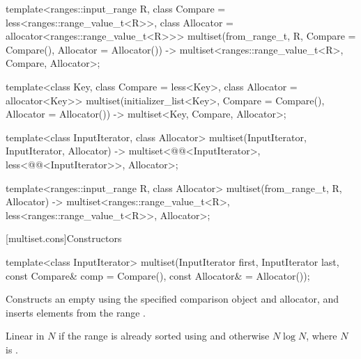 \documentclass{wg21}
\begin{document}
\begin{addedblock}
\begin{codeblock}
template<ranges::input_range R, class Compare = less<ranges::range_value_t<R>>, 
    class Allocator = allocator<ranges::range_value_t<R>>>
multiset(from_range_t, R, Compare = Compare(), Allocator = Allocator())
-> multiset<ranges::range_value_t<R>,  Compare, Allocator>;
\end{codeblock}
\end{addedblock}
\begin{codeblock}

template<class Key, class Compare = less<Key>, class Allocator = allocator<Key>>
multiset(initializer_list<Key>, Compare = Compare(), Allocator = Allocator())
-> multiset<Key, Compare, Allocator>;

template<class InputIterator, class Allocator>
multiset(InputIterator, InputIterator, Allocator)
-> multiset<@@<InputIterator>,
    less<@@<InputIterator>>, Allocator>;

\end{codeblock}
\begin{addedblock}
\begin{codeblock}
template<ranges::input_range R,  class Allocator>
multiset(from_range_t, R, Allocator)
-> multiset<ranges::range_value_t<R>,  less<ranges::range_value_t<R>>, Allocator>;
\end{codeblock}
\end{addedblock}
\begin{codeblock}

template<class Key, class Allocator>
multiset(initializer_list<Key>, Allocator) -> multiset<Key, less<Key>, Allocator>;
}
\end{codeblock}%

[multiset.cons]{Constructors}

%
\begin{itemdecl}
    template<class InputIterator>
    multiset(InputIterator first, InputIterator last,
    const Compare& comp = Compare(), const Allocator& = Allocator());
\end{itemdecl}

\begin{itemdescr}
    \pnum
    \effects
    Constructs an empty
    using the specified comparison object and allocator,
    and inserts elements from the range
    .
    
    \pnum
    \complexity
    Linear in $N$
    if the range
    is already sorted using  and otherwise $N \log N$,
    where $N$ is
    .
\end{itemdescr}
\end{document}
